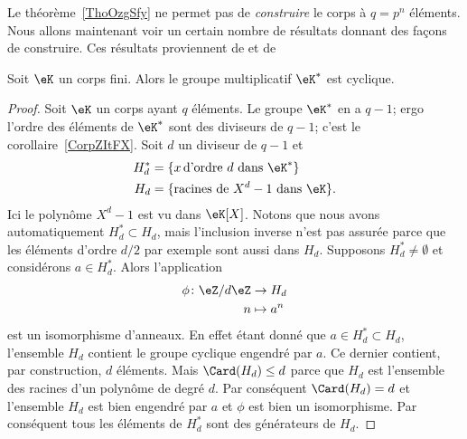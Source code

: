 Le théorème~\ref{ThoOzgSfy} ne permet pas de \emph{construire} le corps à \( q=p^n\) éléments. Nous allons maintenant voir un certain nombre de résultats donnant des façons de construire. Ces résultats proviennent de \cite{MichelMerlecorpsfinis,GabrielPeyre,RodierCorpsFinis} et de 

\begin{proposition}     \label{PropnfebjI}
    Soit \( \eK\) un corps fini. Alors le groupe multiplicatif \( \eK^*\) est cyclique.
\end{proposition}

\begin{proof}
    Soit \( \eK\) un corps ayant \( q\) éléments. Le groupe \( \eK^*\) en a \( q-1\); ergo l'ordre des éléments de \( \eK^*\) sont des diviseurs de \( q-1\); c'est le corollaire~\ref{CorpZItFX}. Soit \( d\) un diviseur de \( q-1\) et
    \begin{subequations}
        \begin{align}
            H^*_d&=\{ x\,\text{d'ordre } d\text{ dans } \eK^* \}\\
            H_d&=\{ \text{racines de } X^d-1\text{ dans } \eK \}.
        \end{align}
    \end{subequations}
    Ici le polynôme \( X^d-1\) est vu dans \( \eK[X]\). Notons que nous avons automatiquement \( H^*_d\subset H_d\), mais l'inclusion inverse n'est pas assurée parce que les éléments d'ordre \( d/2\) par exemple sont aussi dans \( H_d\). Supposons \( H^*_d\neq \emptyset\) et considérons \( a\in H^*_d\). Alors l'application
    \begin{equation}
        \begin{aligned}
            \phi\colon \eZ/d\eZ&\to H_d \\
            n&\mapsto a^n
        \end{aligned}
    \end{equation}
    est un isomorphisme d'anneaux. En effet étant donné que \( a\in H^*_d\subset H_d\), l'ensemble \( H_d\) contient le groupe cyclique engendré par \( a\). Ce dernier contient, par construction, \( d\) éléments. Mais \( \Card(H_d)\leq d\) parce que \( H_d\) est l'ensemble des racines d'un polynôme de degré \( d\). Par conséquent \( \Card(H_d)=d\) et l'ensemble \( H_d\) est bien engendré par \( a\) et \( \phi\) est bien un isomorphisme. Par conséquent tous les éléments de \( H^*_d\) sont des générateurs de \( H_d\).


\end{proof}
